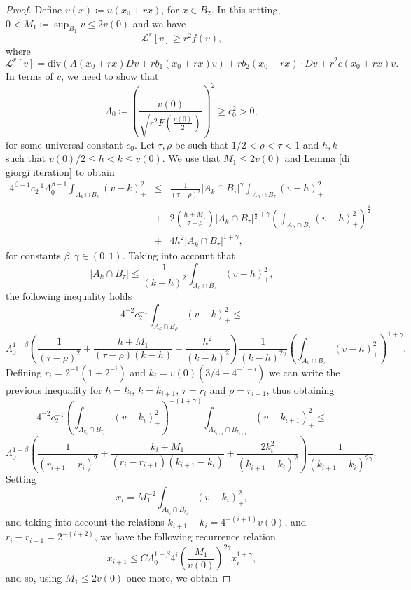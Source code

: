 \documentclass[12pt,a4paper]{amsart}
\numberwithin{equation}{section} %
\theoremstyle{definition}
\theoremstyle{remark}
\begin{document}
\begin{proof}
Define $v(x) \coloneqq u(x_0 + rx)$, for $x \in B_2$. In this setting, $0 < M_1 \coloneqq \sup_{B_1}v \leq 2v(0)$ and we have
$$
    \mathcal{L}^r[v] \geq r^2f(v),
$$
where
$$
    \mathcal{L}^r[v] = \mbox{div}(A(x_0 + rx)Dv + rb_1(x_0 + rx)v) + rb_2(x_0+rx)\cdot Dv + r^2c(x_0+rx)v.
$$
In terms of $v$, we need to show that
$$
    \Lambda_0 \coloneqq \left(\frac{v(0)}{\sqrt{r^2 F\left(\frac{v(0)}{2} \right)}}\right)^2 \geq c_0^2 > 0,
$$
for some universal constant $c_0$. Let $\tau, \rho$ be such that $1/2 < \rho < \tau < 1$ and $h,k$ such that $v(0)/2 \leq h < k \leq v(0)$. We use that $M_1 \leq 2v(0)$ and Lemma \ref{di giorgi iteration} to obtain
\begin{eqnarray*}
    4^{\beta-1}c_2^{-1}\Lambda_0^{\beta-1}\int_{A_k \cap B_\rho}(v-k)_+^2 & \leq & \frac{1}{(\tau-\rho)^2}|A_k \cap B_\tau|^{\gamma} \int_{A_h \cap B_\tau} (v-h)_+^2 \\
    & + & 2\left(\frac{h+M_1}{\tau-\rho}\right)|A_k \cap B_\tau|^{\frac{1}{2} + \gamma}\left(\int_{A_h \cap B_\tau}(v-h)^2_+ \right)^{\frac{1}{2}}\\
    & + &  4h^2|A_k \cap B_\tau|^{1 + \gamma},
\end{eqnarray*}
for constants $\beta, \gamma \in (0,1)$. Taking into account that
$$
    |A_k \cap B_\tau| \leq \frac{1}{(k-h)^2}\int_{A_h \cap B_\tau}(v-h)_+^2,
$$
the following inequality holds
$$
    4^{-2}c_2^{-1}\int_{A_k \cap B_\rho}(v-k)_+^2 \leq
$$
$$
     \Lambda_0^{1-\beta}\left(\frac{1}{(\tau-\rho)^2} + \frac{h+M_1}{(\tau-\rho)(k-h)}+\frac{h^2}{(k-h)^2}\right)\frac{1}{(k-h)^{2\gamma}}\left(\int_{A_h \cap B_\tau}(v-h)_+^2\right)^{1+\gamma}.
$$
Defining $r_i = 2^{-1}(1 + 2^{-i})$ and $k_i = v(0)(3/4 - 4^{-1-i})$ we can write the previous inequality for $h = k_i$, $k = k_{i+1}$, $\tau = r_i$ and $\rho = r_{i+1}$, thus obtaining
$$
    4^{-2}c_2^{-1}\left(\int_{A_{k_i} \cap B_{r_i}}(v-k_i)_+^2\right)^{-(1+\gamma)}\int_{A_{k_{i+1}} \cap B_{r_{i+1}}}(v-k_{i+1})_+^2 \leq
$$    
$$    
     \Lambda_0^{1-\beta}\left(\frac{1}{(r_{i+1}-r_i)^2} + \frac{k_i+M_1}{(r_i-r_{i+1})(k_{i+1}-k_i)} + \frac{2k_i^2}{(k_{i+1}-k_i)^2}\right)\frac{1}{(k_{i+1}-k_i)^{2\gamma}}.
$$
Setting
$$
    x_i = M_1^{-2}\int_{A_{k_i}\cap B_{r_i}}(v -k_i)^2_+,
$$
and taking into account the relations $k_{i+1} - k_i = 4^{-(i+1)}v(0)$, and $r_i - r_{i+1} = 2^{-(i+2)}$, we have the following recurrence relation
$$
    x_{i+1} \leq C\Lambda_0^{1-\beta}4^i\left(\frac{M_1}{v(0)}\right)^{2\gamma} x_i^{1 + \gamma},
$$
and so, using $M_1 \leq 2v(0)$ once more, we obtain

\end{proof}
\end{document}

